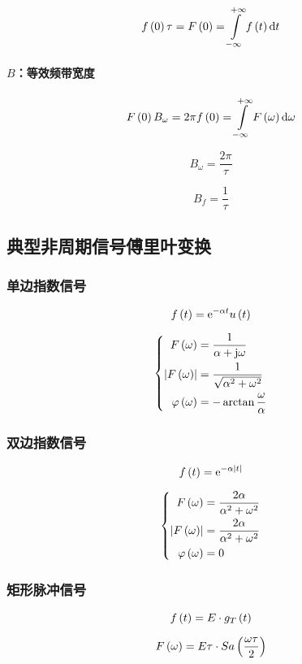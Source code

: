 \documentclass{article}
\begin{document}
\[f\p{0}\tau=F\p{0}=\impint\ft\d t\]

\paragraph{$B$：等效频带宽度}

\[F\p{0}B_\omega=2\pi f\p{0}=\impint \fw\d\omega\]

\[B_\omega=\frac{2\pi}\tau\]

\[B_f=\frac1\tau\]

\subsection{典型非周期信号傅里叶变换}

\subsubsection{单边指数信号}

\[f\left(t\right)=\mathrm e^{-\alpha t}u\left(t\right)\]

\[\left\{\begin{aligned}
        F\left(\omega\right)                  & =\frac1{\alpha+\mathrm j\omega}          \\
        \left|F\left(\omega\right)\right|            & =\frac1{\sqrt{\alpha^2+\omega^2}} \\
        \varphi\left(\omega\right) & =-\arctan\frac\omega\alpha
    \end{aligned}\right.\]

\subsubsection{双边指数信号}

\[f\left(t\right)=\mathrm e^{-\alpha\left|t\right|}\]

\[\left\{\begin{aligned}
        F\left(\omega\right)                  & =\frac{2\alpha}{\alpha^2+\omega^2} \\
        \left|F\left(\omega\right)\right|            & =\frac{2\alpha}{\alpha^2+\omega^2} \\
        \varphi\left(\omega\right) & =0
    \end{aligned}\right.\]

\subsubsection{矩形脉冲信号}

\[f\left(t\right)=E\cdot g_T\left(t\right)\]

\[F\left(\omega\right)=E\tau\cdot Sa\left(\frac{\omega\tau}2\right)\]
\end{document}
